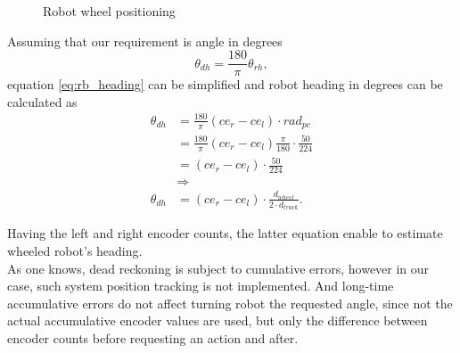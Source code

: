 \begin{figure}[!ht]
	\centering
	\caption{Robot wheel positioning}
	\label{fig:rb_wheel_graph}
\end{figure}
Assuming that our requirement is angle in degrees
$$
\theta_{dh} =  \frac{180}{\pi} \theta_{rh},   
$$
equation \ref{eq:rb_heading} can be simplified and robot heading in degrees can be calculated as
\begin{align*}
\theta_{dh} 
& = \frac{180}{\pi} (ce_{r} - ce_{l} ) \cdot rad_{pc} 								\\
& = \frac{180}{\pi} (ce_{r} - ce_{l} )   \frac{\pi}{180}\cdot \frac{ 50 }{ 224 } 	\\
& = (ce_{r} - ce_{l} ) \cdot \frac{ 50 }{ 224 } 									\\
& \Longrightarrow \\
\theta_{dh}
& = (ce_{r} - ce_{l} ) \cdot \frac{ d_{wheel} }{ 2\cdot d_{track} } .
\end{align*}

Having the left and right encoder counts, the latter equation enable to estimate wheeled robot's heading.
\\
As one knows, dead reckoning is subject to cumulative errors, however in our case, such system position tracking is not implemented. And long-time accumulative errors do not affect turning robot the requested angle, since not the actual accumulative encoder values are used, but only the difference between encoder counts before requesting an action and after.

